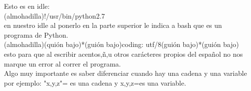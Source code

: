 \documentclass[letterpaper, 12pt, oneside]{article}%
\begin{document}
	Esto es en idle:\\
	 (almohadilla)!/usr/bin/python2.7 \\en nuestro idle al ponerlo en la parte superior le indica a bash que es un programa de Python.\\
 (almohadilla)(quión bajo)*(guión bajo)coding: utf/8(guión bajo)*(guión bajo)\\ esto para que al escribir acentos,ñ,u otros carácteres propios del español no nos marque un error al correr el programa.\\	
 Algo muy importante es saber diferenciar cuando hay una cadena y una variable por ejemplo: "x,y,z"= es una cadena y x,y,z=es una variable.
	
	
	
	

	
	
	
	
	
	
	
	
\end{document}
